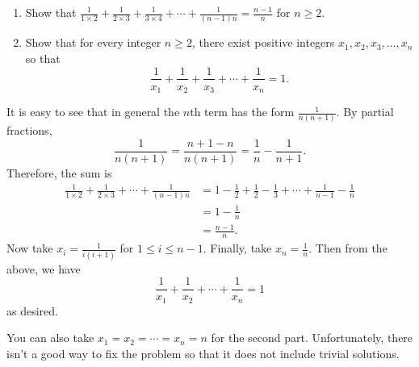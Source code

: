 \begin{question}
    \begin{enumerate}
        \item Show that $\frac{1}{1 \times 2} + \frac{1}{2 \times 3} +
            \frac{1}{3 \times 4} + \cdots + \frac{1}{(n - 1)n} = \frac{n -
            1}{n}$ for $n \geq 2$. 
        
        \item Show that for every integer $n \geq 2$, there exist positive
            integers $x_{1}, x_{2}, x_{3}, \ldots, x_{n}$ so that 
        \[ \frac{1}{x_{1}} + \frac{1}{x_{2}} + \frac{1}{x_{3}} + \cdots +
        \frac{1}{x_{n}} = 1.\] 
    \end{enumerate}
\end{question}
\begin{solution}
    It is easy to see that in general the $n$th term has the form $\frac{1}{n(n
    + 1)}$. By partial fractions,
    \[ \frac{1}{n(n + 1)} = \frac{n + 1 - n}{n(n + 1)} = \frac{1}{n} -
    \frac{1}{n + 1}. \]
    Therefore, the sum is 
    \begin{align*}
        \frac{1}{1 \times 2} + \frac{1}{2 \times 3} + \cdots + \frac{1}{(n - 1)n} &= 1 - \frac{1}{2} + \frac{1}{2} - \frac{1}{3} + \cdots + \frac{1}{n - 1} - \frac{1}{n}\\
        &= 1 - \frac{1}{n}\\
        &= \frac{n - 1}{n}. 
    \end{align*}
    Now take $x_i = \frac{1}{i(i + 1)}$ for $1 \leq i \leq n - 1$. Finally,
    take $x_n = \frac{1}{n}$. Then from the above, we have
    \[ \frac{1}{x_1} + \frac{1}{x_2} + \cdots + \frac{1}{x_n} = 1 \]
    as desired.
\end{solution}
\begin{remark}
    You can also take $x_1 = x_2 = \cdots = x_n = n$ for the second part.
    Unfortunately, there isn't a good way to fix the problem so that it does
    not include trivial solutions.
\end{remark}

